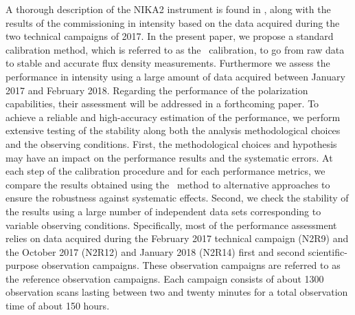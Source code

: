 A thorough description of the NIKA2 instrument is found in \citet{Adam2018},
along with the results of the commissioning in intensity based on the
data acquired during the two technical campaigns of 2017.
%
{\lp In the present paper, we propose a standard calibration method, which is
referred to as the \baseline\ calibration, to go from raw data to
stable and accurate flux density measurements.} 
%
%
Furthermore we assess the performance in intensity using a large
amount of data acquired between January 2017 and February 2018.
Regarding the performance of the polarization capabilities, their
assessment will be addressed in a forthcoming paper.
To achieve a reliable and high-accuracy estimation
of the performance, we perform extensive testing of the
stability along both the analysis methodological
choices and the observing conditions.
{\lp First, the methodological choices and hypothesis may have an impact on
the performance results and the systematic errors. At each step of the
calibration procedure and for each performance metrics, we compare the
results obtained using the \baseline\ method to alternative approaches to
ensure the robustness against systematic effects.}
Second, we check the stability of the results using a large number of
independent data sets corresponding to variable observing conditions.
Specifically, most of the performance assessment relies on data
acquired during the February 2017 technical campaign (N2R9) and the
October 2017 (N2R12) and January 2018 (N2R14) first and second
scientific-purpose observation campaigns. {\lp These observation
campaigns are referred to as the {\emph reference observation campaigns}.}
Each campaign consists of about 1300 observation scans lasting between
two and twenty minutes for a total observation time of about 150 hours. 

